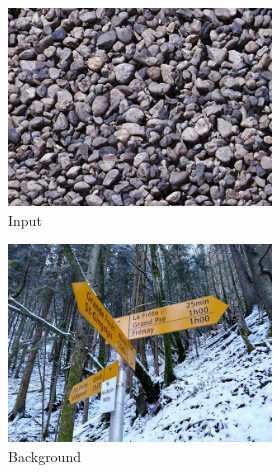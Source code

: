 \begin{figure}[]
\begin{subfigure}{\textwidth}
        \begin{subfigure}{0.24\textwidth}
            \centering
            \includegraphics[width=\textwidth]{images/04-experiment02/photo/pebbles/target.jpg}
            \caption*{Input}
        \end{subfigure}
        \hfill
        \begin{subfigure}{0.24\textwidth}
            \centering
            \includegraphics[width=\textwidth]{images/04-experiment02/photo/bg.jpg}
            \caption*{Background}
        \end{subfigure}
        \hfill
        \begin{subfigure}{0.24\textwidth}
            \centering

\end{subfigure}
\end{subfigure}
\end{figure}
